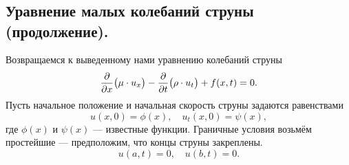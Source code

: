	\chapter{}
\label{lecture12}
\section{Уравнение малых колебаний струны (продолжение).}
\label{lecture12section1}
%
Возвращаемся к выведенному нами уравнению колебаний струны
\begin{equation}
	\label{l12:eq:1}
	\frac{\partial}{\partial x}\big(\mu\cdot u_x\big)-\frac{\partial}{\partial t}\big(\rho\cdot u_t\big)+f(x,t)=0.
\end{equation}
Пусть начальное положение и начальная скорость струны задаются равенствами 
\begin{equation}
	\label{l12:eq:2}
	 u(x,0)=\phi(x),\quad u_t(x,0)=\psi(x),
\end{equation} 
где $\phi(x)$ и $\psi(x)$ --- известные функции. Граничные условия возьмём простейшие --- предположим, что концы струны закреплены.
\begin{equation}
	\label{l12:eq:3}
	 u(a,t)=0,\quad u(b,t)=0.
\end{equation}


